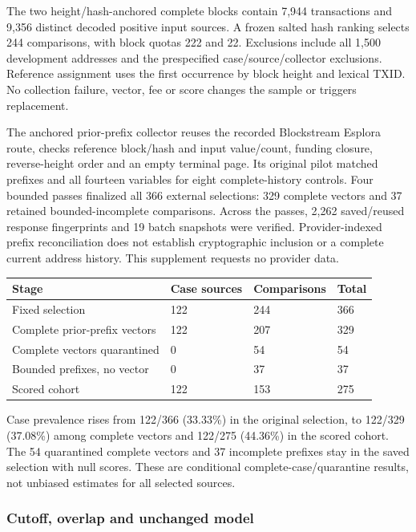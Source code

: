 The two height/hash-anchored complete blocks contain 7,944 transactions
and 9,356 distinct decoded positive input sources. A frozen salted hash
ranking selects 244 comparisons, with block quotas 222 and 22.
Exclusions include all 1,500 development addresses and the prespecified
case/source/collector exclusions. Reference assignment uses the first
occurrence by block height and lexical TXID. No collection failure,
vector, fee or score changes the sample or triggers replacement.

The anchored prior-prefix collector reuses the recorded Blockstream
Esplora route, checks reference block/hash and input value/count,
funding closure, reverse-height order and an empty terminal page. Its
original pilot matched prefixes and all fourteen variables for eight
complete-history controls. Four bounded passes finalized all 366
external selections: 329 complete vectors and 37 retained
bounded-incomplete comparisons. Across the passes, 2,262 saved/reused
response fingerprints and 19 batch snapshots were verified.
Provider-indexed prefix reconciliation does not establish cryptographic
inclusion or a complete current address history. This supplement
requests no provider data.

\begin{longtable}[]{@{}llll@{}}
\toprule\noalign{}
Stage & Case sources & Comparisons & Total \\
\midrule\noalign{}
\endhead
\bottomrule\noalign{}
\endlastfoot
Fixed selection & 122 & 244 & 366 \\
Complete prior-prefix vectors & 122 & 207 & 329 \\
Complete vectors quarantined & 0 & 54 & 54 \\
Bounded prefixes, no vector & 0 & 37 & 37 \\
Scored cohort & 122 & 153 & 275 \\
\end{longtable}

Case prevalence rises from 122/366 (33.33\%) in the original selection,
to 122/329 (37.08\%) among complete vectors and 122/275 (44.36\%) in the
scored cohort. The 54 quarantined complete vectors and 37 incomplete
prefixes stay in the saved selection with null scores. These are
conditional complete-case/quarantine results, not unbiased estimates for
all selected sources.

\subsubsection{Cutoff, overlap and unchanged
model}\label{cutoff-overlap-and-unchanged-model}

